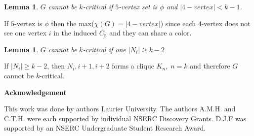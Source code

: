 \documentclass[12pt]{article}
\newtheorem{Lemma}[Theorem]{Lemma}
\begin{document}
\begin{Lemma}\label{lem:4v-min}
$G$ cannot be $k$-critical if $5$-vertex set is $\phi$ and $|4-vertex| < k - 1$.
\end{Lemma}
 If $5$-vertex is $\phi$ then the max($\chi(G) = |4-vertex|$) since each $4$-vertex does not see one vertex $i$ in the induced $C_5$ and they can share a color.

\begin{Lemma}\label{Lem:Ni-max}
$G$ cannot be $k$-critical if one $|N_i| \geq k - 2$
\end{Lemma}
 If $|N_i| \geq k -2$, then $N_i, i+1, i+2$ forms a clique $K_n,\; n = k$ and therefore $G$ cannot be $k$-critical. 


\begin{center}
{\bf Acknowledgement}
\end{center}
This work was done by authors  Laurier University. The authors A.M.H. and C.T.H. were each supported by individual NSERC Discovery Grants. D.J.F was supported by an NSERC Undergraduate Student Research Award.


\clearpage
\begin{thebibliography}{99}

\end{thebibliography}
\end{document}
